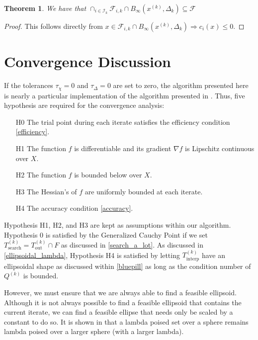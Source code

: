 \documentclass{article}
\newtheorem{theorem}{Theorem}[section]
\theoremstyle{case}
\newcommand{\domain}{X}
\newcommand{\outertrk}{{T_{\text{out}}^{(k)}}}
\newcommand{\searchtrk}{{T_{\text{search}}^{(k)}}}
\newcommand{\sampletrk}{{T_{\text{interp}}^{(k)}}}
\newcommand{\feasible}{{F}}
\newcommand{\qk}{{Q^{(k)}}}
\newcommand{\dk}{\Delta_k}
\newcommand{\xk}{{x^{(k)}}}
\newcommand{\fik}{{\mathcal F_{i, k}}}
\newcommand{\iik}{{\mathcal I_{k}}}
\newcommand{\f}{{\mathcal F}}
\begin{document}
\begin{theorem}
We have that $\cap_{i \in \iik} \fik \cap B_{\infty}(\xk, \dk) \subseteq \f$ 
\end{theorem}

\begin{proof}
This follows directly from $x \in \fik \cap B_{\infty}(\xk, \dk) \Longrightarrow c_i(x) \le 0$.
\end{proof}



\section{Convergence Discussion}
\label{convergence_discussion}

If the tolerances $\tau_{\chi} = 0$ and $\tau_{\Delta} = 0$ are set to zero, the algorithm presented here is nearly a particular implementation of the algorithm presented in \cite{doi:10.1080/10556788.2015.1026968}.
Thus, five hypothesis are required for the convergence analysis:

\begin{itemize}
\item[H0] The trial point during each iterate satisfies the efficiency condition \cref{efficiency}.
\item[H1] The function $f$ is differentiable and its gradient $\nabla f$ is Lipschitz continuous over $\domain$.
\item[H2] The function $f$ is bounded below over $\domain$.
\item[H3] The Hessian's of $f$ are uniformly bounded at each iterate.
\item[H4] The accuracy condition \cref{accuracy}.
\end{itemize}

Hypothesis H1, H2, and H3 are kept as assumptions within our algorithm.
Hypothesis 0 is satisfied by the Generalized Cauchy Point \cite{Conn:2000:TM:357813} if we set $\searchtrk = \outertrk \cap \feasible$ as discussed in \cref{search_a_lot}.
As discussed in \cref{ellipsoidal_lambda}, Hypothesis H4 is satisfied by letting $\sampletrk$ have an ellipsoidal shape as discussed within \cref{bluepill} as long as the condition number of $\qk$ is bounded.

However, we must ensure that we are always able to find a feasible ellipsoid.
Although it is not always possible to find a feasible ellipsoid that contains the current iterate,
we can find a feasible ellipse that needs only be scaled by a constant to do so.
It is shown in \cite{Billups_Larson_2013} that a lambda poised set over a sphere remains lambda poised over a larger sphere (with a larger lambda).
\end{document}
